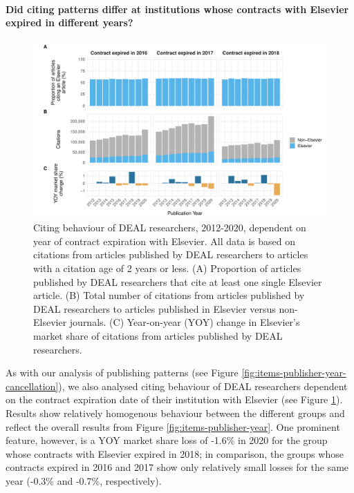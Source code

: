\documentclass[
]{article}
\begin{document}
\hypertarget{did-citing-patterns-differ-at-institutions-whose-contracts-with-elsevier-expired-in-different-years}{%
\paragraph{Did citing patterns differ at institutions whose contracts with Elsevier expired in different years?}\label{did-citing-patterns-differ-at-institutions-whose-contracts-with-elsevier-expired-in-different-years}}

\begin{figure}

{\centering \includegraphics[width=0.833\linewidth]{analysis_files/figure-latex/references-publisher-year-cancellation-1} 

}

\caption{Citing behaviour of DEAL researchers, 2012-2020, dependent on year of contract expiration with Elsevier. All data is based on citations from articles published by DEAL researchers to articles with a citation age of 2 years or less. (A) Proportion of articles published by DEAL researchers that cite at least one single Elsevier article. (B) Total number of citations from articles published by DEAL researchers to articles published in Elsevier versus non-Elsevier journals. (C) Year-on-year (YOY) change in Elsevier's market share of citations from articles published by DEAL researchers.}\label{fig:references-publisher-year-cancellation}
\end{figure}

As with our analysis of publishing patterns (see Figure \ref{fig:items-publisher-year-cancellation}), we also analysed citing behaviour of DEAL researchers dependent on the contract expiration date of their institution with Elsevier (see Figure \ref{fig:references-publisher-year-cancellation}). Results show relatively homogenous behaviour between the different groups and reflect the overall results from Figure \ref{fig:items-publisher-year}. One prominent feature, however, is a YOY market share loss of -1.6\% in 2020 for the group whose contracts with Elsevier expired in 2018; in comparison, the groups whose contracts expired in 2016 and 2017 show only relatively small losses for the same year (-0.3\% and -0.7\%, respectively).
\end{document}
